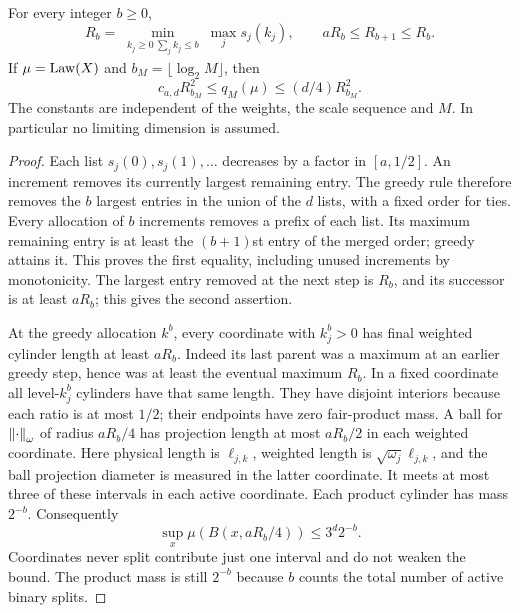 \begin{lemma}\label{lem:greedy}
For every integer $b\ge0$,
\begin{equation}\label{eq:minmaxscale}
 R_b=\min_{\substack{k_j\ge0\ \sum_jk_j\le b}}\max_j s_j(k_j),
 \qquad aR_b\le R_{b+1}\le R_b.
\end{equation}
If $\mu=\operatorname{Law}(X)$ and $b_M=\lfloor\log_2M\rfloor$, then
\begin{equation}\label{eq:physicalquant}
 c_{a,d}R_{b_M}^2\le q_M(\mu)\le(d/4)R_{b_M}^2.
\end{equation}
The constants are independent of the weights, the scale sequence and $M$. In particular no limiting dimension is assumed.
\end{lemma}
\begin{proof}
Each list $s_j(0),s_j(1),\ldots$ decreases by a factor in $[a,1/2]$. An increment removes its currently largest remaining entry. The greedy rule therefore removes the $b$ largest entries in the union of the $d$ lists, with a fixed order for ties. Every allocation of $b$ increments removes a prefix of each list. Its maximum remaining entry is at least the $(b+1)$st entry of the merged order; greedy attains it. This proves the first equality, including unused increments by monotonicity. The largest entry removed at the next step is $R_b$, and its successor is at least $aR_b$; this gives the second assertion.

At the greedy allocation $k^b$, every coordinate with $k_j^b>0$ has final weighted cylinder length at least $aR_b$. Indeed its last parent was a maximum at an earlier greedy step, hence was at least the eventual maximum $R_b$. In a fixed coordinate all level-$k_j^b$ cylinders have that same length. They have disjoint interiors because each ratio is at most $1/2$; their endpoints have zero fair-product mass. A ball for $\left\lVert\cdot\right\rVert_\omega$ of radius $aR_b/4$ has projection length at most $aR_b/2$ in each weighted coordinate. Here physical length is $\ell_{j,k}$, weighted length is $\sqrt{\omega_j}\ell_{j,k}$, and the ball projection diameter is measured in the latter coordinate. It meets at most three of these intervals in each active coordinate. Each product cylinder has mass $2^{-b}$. Consequently
\begin{equation}\label{eq:productsmallball}
 \sup_x\mu(B(x,aR_b/4))\le3^d2^{-b}.
\end{equation}
Coordinates never split contribute just one interval and do not weaken the bound. The product mass is still $2^{-b}$ because $b$ counts the total number of active binary splits.


\end{proof}
